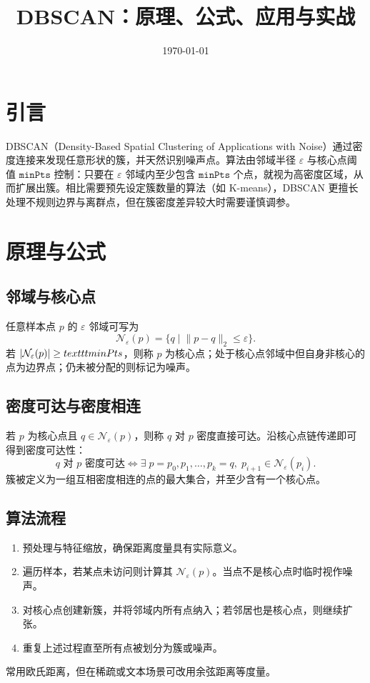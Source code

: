 \documentclass[UTF8,zihao=-4]{ctexart}
\title{DBSCAN：原理、公式、应用与实战}
\author{}
\date{\today}
\begin{document}
\maketitle

\section{引言}
DBSCAN（Density-Based Spatial Clustering of Applications with Noise）通过密度连接来发现任意形状的簇，并天然识别噪声点。算法由邻域半径 \(\varepsilon\) 与核心点阈值 \(\texttt{minPts}\) 控制：只要在 \(\varepsilon\) 邻域内至少包含 \(\texttt{minPts}\) 个点，就视为高密度区域，从而扩展出簇。相比需要预先设定簇数量的算法（如 K-means），DBSCAN 更擅长处理不规则边界与离群点，但在簇密度差异较大时需要谨慎调参。

\section{原理与公式}
\subsection{邻域与核心点}
任意样本点 \(p\) 的 \(\varepsilon\) 邻域可写为
\begin{equation}
\mathcal{N}_\varepsilon(p) = \{ q\mid \lVert p - q \rVert_2 \le \varepsilon \}.
\end{equation}
若 \(|\mathcal{N}_\varepsilon(p)| \ge \\texttt{minPts}\)，则称 \(p\) 为核心点；处于核心点邻域中但自身非核心的点为边界点；仍未被分配的则标记为噪声。

\subsection{密度可达与密度相连}
若 \(p\) 为核心点且 \(q \in \mathcal{N}_\varepsilon(p)\)，则称 \(q\) 对 \(p\) 密度直接可达。沿核心点链传递即可得到密度可达性：
\begin{equation}
q \text{ 对 } p \text{ 密度可达} \iff \exists \; p = p_0, p_1, \dots, p_k = q, \; p_{i+1} \in \mathcal{N}_\varepsilon(p_i).
\end{equation}
簇被定义为一组互相密度相连的点的最大集合，并至少含有一个核心点。

\subsection{算法流程}
\begin{enumerate}
  \item 预处理与特征缩放，确保距离度量具有实际意义。
  \item 遍历样本，若某点未访问则计算其 \(\mathcal{N}_\varepsilon(p)\)。当点不是核心点时临时视作噪声。
  \item 对核心点创建新簇，并将邻域内所有点纳入；若邻居也是核心点，则继续扩张。
  \item 重复上述过程直至所有点被划分为簇或噪声。
\end{enumerate}
常用欧氏距离，但在稀疏或文本场景可改用余弦距离等度量。
\end{document}
